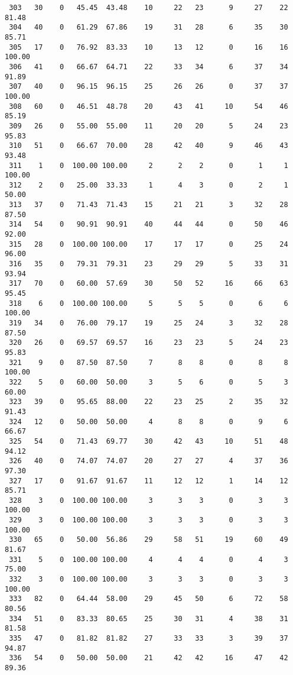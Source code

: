 \begin{verbatim}
 303   30    0   45.45  43.48    10     22   23      9     27    22    81.48
 304   40    0   61.29  67.86    19     31   28      6     35    30    85.71
 305   17    0   76.92  83.33    10     13   12      0     16    16   100.00
 306   41    0   66.67  64.71    22     33   34      6     37    34    91.89
 307   40    0   96.15  96.15    25     26   26      0     37    37   100.00
 308   60    0   46.51  48.78    20     43   41     10     54    46    85.19
 309   26    0   55.00  55.00    11     20   20      5     24    23    95.83
 310   51    0   66.67  70.00    28     42   40      9     46    43    93.48
 311    1    0  100.00 100.00     2      2    2      0      1     1   100.00
 312    2    0   25.00  33.33     1      4    3      0      2     1    50.00
 313   37    0   71.43  71.43    15     21   21      3     32    28    87.50
 314   54    0   90.91  90.91    40     44   44      0     50    46    92.00
 315   28    0  100.00 100.00    17     17   17      0     25    24    96.00
 316   35    0   79.31  79.31    23     29   29      5     33    31    93.94
 317   70    0   60.00  57.69    30     50   52     16     66    63    95.45
 318    6    0  100.00 100.00     5      5    5      0      6     6   100.00
 319   34    0   76.00  79.17    19     25   24      3     32    28    87.50
 320   26    0   69.57  69.57    16     23   23      5     24    23    95.83
 321    9    0   87.50  87.50     7      8    8      0      8     8   100.00
 322    5    0   60.00  50.00     3      5    6      0      5     3    60.00
 323   39    0   95.65  88.00    22     23   25      2     35    32    91.43
 324   12    0   50.00  50.00     4      8    8      0      9     6    66.67
 325   54    0   71.43  69.77    30     42   43     10     51    48    94.12
 326   40    0   74.07  74.07    20     27   27      4     37    36    97.30
 327   17    0   91.67  91.67    11     12   12      1     14    12    85.71
 328    3    0  100.00 100.00     3      3    3      0      3     3   100.00
 329    3    0  100.00 100.00     3      3    3      0      3     3   100.00
 330   65    0   50.00  56.86    29     58   51     19     60    49    81.67
 331    5    0  100.00 100.00     4      4    4      0      4     3    75.00
 332    3    0  100.00 100.00     3      3    3      0      3     3   100.00
 333   82    0   64.44  58.00    29     45   50      6     72    58    80.56
 334   51    0   83.33  80.65    25     30   31      4     38    31    81.58
 335   47    0   81.82  81.82    27     33   33      3     39    37    94.87
 336   54    0   50.00  50.00    21     42   42     16     47    42    89.36

\end{verbatim}
